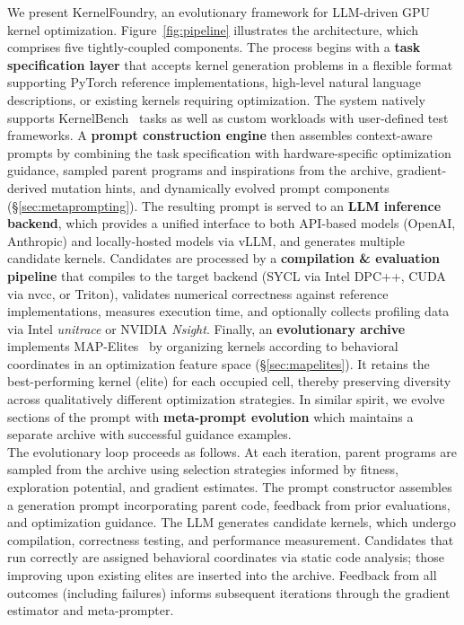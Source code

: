 We present KernelFoundry, an evolutionary framework for LLM-driven GPU kernel optimization. Figure~\ref{fig:pipeline} illustrates the architecture, which comprises five tightly-coupled components. The process begins with a \textbf{task specification layer} that accepts kernel generation problems in a flexible format  supporting PyTorch reference implementations, high-level natural language descriptions, or existing kernels requiring optimization. The system natively supports KernelBench~\citep{ouyang2025kernelbench} tasks as well as custom workloads with user-defined test frameworks. A \textbf{prompt construction engine} then assembles context-aware prompts by combining the task specification with hardware-specific optimization guidance, sampled parent programs and inspirations from the archive, gradient-derived mutation hints, and dynamically evolved prompt components (\S\ref{sec:metaprompting}). The resulting prompt is served to an \textbf{LLM inference backend}, which provides a unified interface to both API-based models (OpenAI, Anthropic) and locally-hosted models via vLLM, and generates multiple candidate kernels. Candidates are processed by a \textbf{compilation \& evaluation pipeline} that compiles to the target backend (SYCL via Intel DPC++, CUDA via nvcc, or Triton), validates numerical correctness against reference implementations, measures execution time, and optionally collects profiling data via Intel \emph{unitrace} or NVIDIA \emph{Nsight}. Finally, an \textbf{evolutionary archive} implements MAP-Elites~\citep{mouret2015illuminating} by organizing kernels according to behavioral coordinates in an optimization feature space (\S\ref{sec:mapelites}). It retains the best-performing kernel (elite) for each occupied cell, thereby preserving diversity across qualitatively different optimization strategies.
In similar spirit, we evolve sections of the prompt with \textbf{meta-prompt evolution} which maintains a separate archive with successful guidance examples.\\
The evolutionary loop proceeds as follows. At each iteration, parent programs are sampled from the archive using selection strategies informed by fitness, exploration potential, and gradient estimates. The prompt constructor assembles a generation prompt incorporating parent code, feedback from prior evaluations, and optimization guidance. 
The LLM generates candidate kernels, which undergo compilation, correctness testing, and performance measurement. Candidates that run correctly are assigned behavioral coordinates via static code analysis; those improving upon existing elites are inserted into the archive. Feedback from all outcomes (including failures) informs subsequent iterations through the gradient estimator and meta-prompter.

